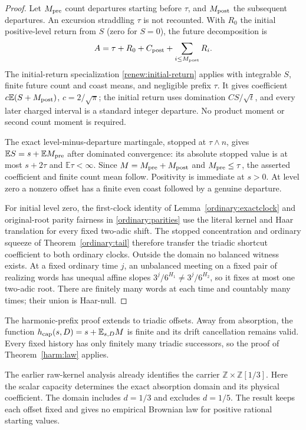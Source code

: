 \documentclass[11pt]{amsart}
\theoremstyle{definition}
\theoremstyle{remark}
\newcommand{\Z}{\mathbb Z}
\newcommand{\E}{\mathbb E}
\begin{document}
\begin{proof}
Let $M_{\rm pre}$ count departures starting before $\tau$, and
$M_{\rm post}$ the subsequent departures. An excursion straddling
$\tau$ is not recounted. With $R_0$ the initial positive-level return
from $S$ (zero for $S=0$), the future decomposition is
\[
 A=\tau+R_0+C_{\rm post}+\sum_{i\le M_{\rm post}}R_i.
\]
The initial-return specialization \eqref{renew:initial-return} applies with integrable $S$, finite
future count and coast means, and negligible prefix $\tau$.
It gives coefficient $c\E(S+M_{\rm post})$, $c=2/\sqrt\pi$;
the initial return uses domination $CS/\sqrt t$, and every later
charged interval is a standard integer departure. No product moment
or second count moment is required.

The exact level-minus-departure martingale, stopped at $\tau\wedge n$,
gives $\E S=s+\E M_{\rm pre}$ after dominated convergence:
its absolute stopped value is at most $s+2\tau$ and $\E\tau<\infty$.
Since $M=M_{\rm pre}+M_{\rm post}$ and $M_{\rm pre}\le\tau$,
the asserted coefficient and finite count mean follow. Positivity is
immediate at $s>0$. At level zero a nonzero offset has a finite even
coast followed by a genuine departure.

For initial level zero, the first-clock identity of
Lemma~\ref{ordinary:exactclock} and original-root parity fairness in
\eqref{ordinary:parities} use the literal kernel and Haar translation
for every fixed two-adic shift. The stopped concentration and ordinary
squeeze of Theorem~\ref{ordinary:tail} therefore transfer the triadic
shortcut coefficient to both ordinary clocks.
Outside the domain no balanced witness exists. At a fixed ordinary time $j$,
an unbalanced meeting on a fixed pair of realizing words has unequal
affine slopes $3^j/6^{H_1}\ne3^j/6^{H_2}$, so it fixes at most one two-adic root. There are finitely
many words at each time and countably many times; their union is Haar-null.
\end{proof}

The harmonic-prefix proof extends to triadic offsets. Away from absorption,
the function $h_{\rm cap}(s,D)=s+\E_{s,D}M$ is finite and its drift cancellation
remains valid. Every fixed history has only finitely many triadic
successors, so the proof of Theorem~\ref{harm:law} applies.

The earlier raw-kernel analysis already identifies the carrier
$\Z\times\Z[1/3]$. Here the scalar capacity determines the exact
absorption domain and its physical coefficient. The domain includes $d=1/3$ and excludes
$d=1/5$. The result keeps each offset fixed and gives no empirical
Brownian law for positive rational starting values.
\end{document}
